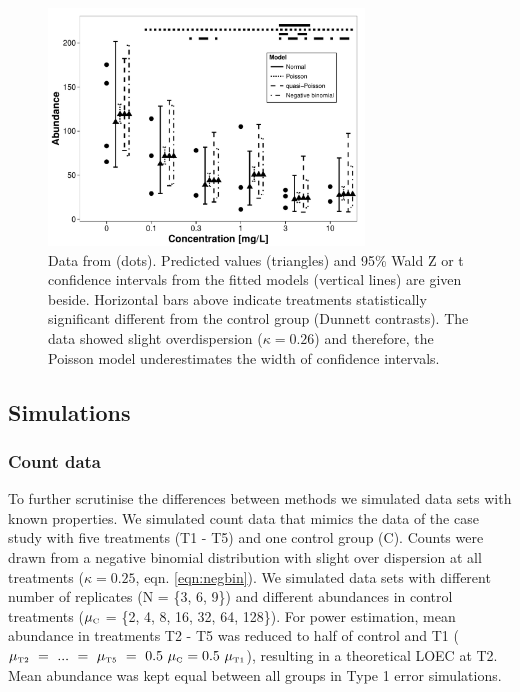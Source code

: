 \documentclass[twocolumn, natbib]{svjour3}
\begin{document}
\begin{figure}[h]
  \centering
  \includegraphics[width = 84mm]{example.pdf}
  \caption{Data from \citet{brock_minimum_2015} (dots). 
  Predicted values (triangles) and 95\% Wald Z or t confidence intervals from the fitted models (vertical lines) are given beside.
  Horizontal bars above indicate treatments statistically significant different from the control group (Dunnett contrasts).
  The data showed slight overdispersion ($\kappa = 0.26$) and therefore, the Poisson model underestimates the width of confidence intervals.
  }
  \label{fig:example}
\end{figure}


\subsection{Simulations}
\subsubsection{Count data}
To further scrutinise the differences between methods we simulated data sets with known properties.
We simulated count data that mimics the data of the case study with five treatments (T1 - T5) and one control group (C).
Counts were drawn from a negative binomial distribution with slight over dispersion at all treatments ($\kappa = 0.25$, eqn. \ref{eqn:negbin}).
We simulated data sets with different number of replicates (N = \{3, 6, 9\}) and different abundances in control treatments ($\mu_\text{\tiny C}$ = \{2, 4, 8, 16, 32, 64, 128\}). 
For power estimation, mean abundance in treatments T2 - T5 was reduced to half of control and T1 ($\mu_\text{\tiny T2}~=~...~=~\mu_\text{\tiny T5}~=~0.5~\mu_\text{\tiny C} = 0.5~\mu_\text{\tiny T1}$), resulting in a theoretical LOEC at T2.
Mean abundance was kept equal between all groups in Type 1 error simulations.
\end{document}
